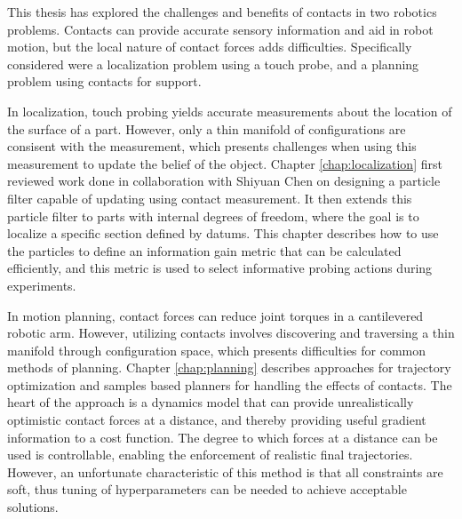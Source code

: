 \documentclass[../thesis.tex]{subfiles}
\begin{document}

This thesis has explored the challenges and benefits of contacts in two robotics problems.
Contacts can provide accurate sensory information and aid in robot motion, but the local nature of contact forces adds difficulties.
Specifically considered were a localization problem using a touch probe, and a planning problem using contacts for support.

In localization, touch probing yields accurate measurements about the location of the surface of a part.
However, only a thin manifold of configurations are consisent with the measurement, which presents challenges when using this measurement to update the belief of the object.
Chapter \ref{chap:localization} first reviewed work done in collaboration with Shiyuan Chen \cite{Saund2017} on designing a particle filter capable of updating using contact measurement.
It then extends this particle filter to parts with internal degrees of freedom, where the goal is to localize a specific section defined by datums.
This chapter describes how to use the particles to define an information gain metric that can be calculated efficiently, and this metric is used to select informative probing actions during experiments.

In motion planning, contact forces can reduce joint torques in a cantilevered robotic arm.
However, utilizing contacts involves discovering and traversing a thin manifold through configuration space, which presents difficulties for common methods of planning.
Chapter \ref{chap:planning} describes approaches for trajectory optimization and samples based planners for handling the effects of contacts.
The heart of the approach is a dynamics model that can provide unrealistically optimistic contact forces at a distance, and thereby providing useful gradient information to a cost function.
The degree to which forces at a distance can be used is controllable, enabling the enforcement of realistic final trajectories.
However, an unfortunate characteristic of this method is that all constraints are soft, thus tuning of hyperparameters can be needed to achieve acceptable solutions.
\end{document}
